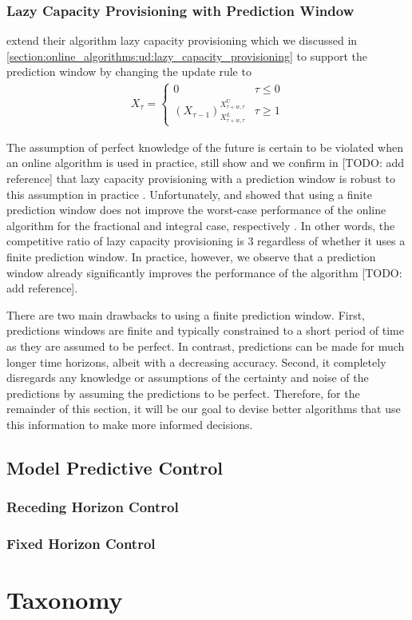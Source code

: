 \subsubsection{Lazy Capacity Provisioning with Prediction Window}

\citeauthor*{Lin2011} extend their algorithm lazy capacity provisioning which we discussed in \autoref{section:online_algorithms:ud:lazy_capacity_provisioning} to support the prediction window by changing the update rule to \begin{align*}
    X_{\tau} = \begin{cases}
        0 & \tau \leq 0 \\
        (X_{\tau-1})_{X_{\tau+w,\tau}^L}^{X_{\tau+w,\tau}^U} & \tau \geq 1
    \end{cases}
\end{align*}

The assumption of perfect knowledge of the future is certain to be violated when an online algorithm is used in practice, still \citeauthor*{Lin2011} show and we confirm in [TODO: add reference] that lazy capacity provisioning with a prediction window is robust to this assumption in practice \cite{Lin2011}. Unfortunately, \citeauthor*{Lin2011} and \citeauthor*{Albers2018} showed that using a finite prediction window does not improve the worst-case performance of the online algorithm for the fractional and integral case, respectively \cite{Lin2011, Albers2018}. In other words, the competitive ratio of lazy capacity provisioning is $3$ regardless of whether it uses a finite prediction window. In practice, however, we observe that a prediction window already significantly improves the performance of the algorithm [TODO: add reference].

There are two main drawbacks to using a finite prediction window. First, predictions windows are finite and typically constrained to a short period of time as they are assumed to be perfect. In contrast, predictions can be made for much longer time horizons, albeit with a decreasing accuracy. Second, it completely disregards any knowledge or assumptions of the certainty and noise of the predictions by assuming the predictions to be perfect. Therefore, for the remainder of this section, it will be our goal to devise better algorithms that use this information to make more informed decisions.

\subsection{Model Predictive Control}

\subsubsection{Receding Horizon Control}

\subsubsection{Fixed Horizon Control}

\section{Taxonomy}
